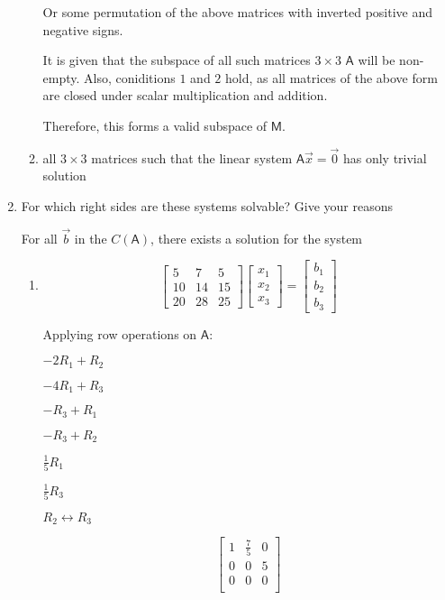 \documentclass[a4paper, 11pt]{article}
\newcommand{\mat}[1]{\boldsymbol { \mathsf{#1}} }
\begin{document}
\begin{enumerate}
\begin{enumerate}[label=(\alph*)]
    Or some permutation of the above matrices with inverted positive and negative signs.
    
    It is given that the subspace of all such matrices $3 \times 3$ $\mat{A}$ will be non-empty. Also, coniditions $1$ and $2$ hold, as all matrices of the above form are closed under scalar multiplication and addition.
    
    Therefore, this forms a valid subspace of $\mat{M}$.
\item all $3 \times 3$ matrices such that the linear system $\mat A \vec x = \vec 0$ has only trivial solution
\end{enumerate}



\item For which right sides are these systems solvable? Give your reasons

For all $\vec b$ in the $C(\mat A)$, there exists a solution for the system

\begin{enumerate}
\item
\[ 
\left[ \begin{array}{ccc}
5  &   7 &  5\\
10  &   14 &  15\\
20 & 28 & 25
\end{array} \right]
%
\left[ \begin{array}{c}
 x_1\\
 x_2\\
x_3 
\end{array} \right]
%
= \left[ \begin{array}{c}
 b_1\\
 b_2\\
 b_3 
\end{array} \right]
\]

Applying row operations on $\mat A$: 

\begin{center}
$-2R_1 + R_2$

$-4R_1 + R_3$

$-R_3 + R_1$

$-R_3 + R_2$

$\frac{1}{5} R_1$

$\frac{1}{5} R_3$

$ R_2 \leftrightarrow R_3$
\end{center}


\[ 
\left[ \begin{array}{ccc}
1 & \frac{7}{5} & 0 \\
0 & 0 & 5 \\
0 & 0 & 0 \\
\end{array} \right]
\]


\end{enumerate}
\end{enumerate}
\end{document}
